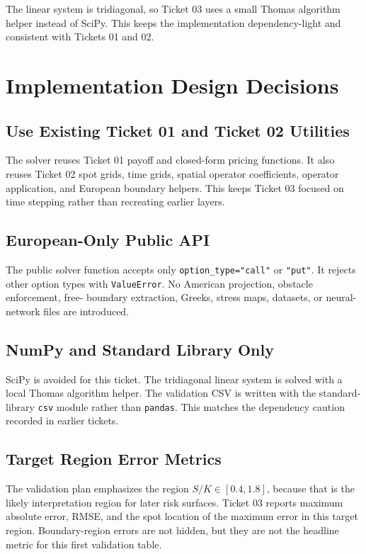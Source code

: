 \documentclass[11pt,a4paper]{article}
\newcommand{\code}[1]{\texttt{#1}}
\begin{document}
The linear system is tridiagonal, so Ticket 03 uses a small Thomas algorithm helper instead of
SciPy. This keeps the implementation dependency-light and consistent with Tickets 01 and 02.

\section{Implementation Design Decisions}

\subsection{Use Existing Ticket 01 and Ticket 02 Utilities}

The solver reuses Ticket 01 payoff and closed-form pricing functions. It also reuses Ticket 02
spot grids, time grids, spatial operator coefficients, operator application, and European boundary
helpers. This keeps Ticket 03 focused on time stepping rather than recreating earlier layers.

\subsection{European-Only Public API}

The public solver function accepts only \code{option\_type="call"} or \code{"put"}. It rejects
other option types with \code{ValueError}. No American projection, obstacle enforcement, free-
boundary extraction, Greeks, stress maps, datasets, or neural-network files are introduced.

\subsection{NumPy and Standard Library Only}

SciPy is avoided for this ticket. The tridiagonal linear system is solved with a local Thomas
algorithm helper. The validation CSV is written with the standard-library \code{csv} module rather
than \code{pandas}. This matches the dependency caution recorded in earlier tickets.

\subsection{Target Region Error Metrics}

The validation plan emphasizes the region \(S/K \in [0.4,1.8]\), because that is the likely
interpretation region for later risk surfaces. Ticket 03 reports maximum absolute error, RMSE,
and the spot location of the maximum error in this target region. Boundary-region errors are not
hidden, but they are not the headline metric for this first validation table.
\end{document}
